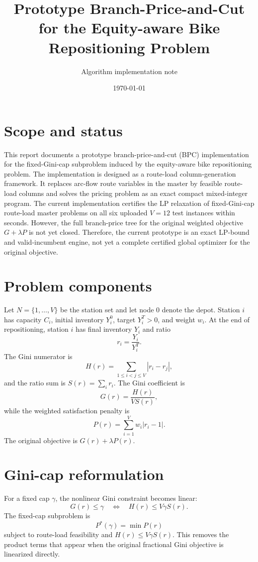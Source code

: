 \documentclass[11pt]{article}
\title{Prototype Branch-Price-and-Cut for the Equity-aware Bike Repositioning Problem}
\author{Algorithm implementation note}
\date{\today}
\begin{document}
\maketitle

\section{Scope and status}
This report documents a prototype branch-price-and-cut (BPC) implementation for the fixed-Gini-cap subproblem induced by the equity-aware bike repositioning problem.  The implementation is designed as a route-load column-generation framework.  It replaces arc-flow route variables in the master by feasible route-load columns and solves the pricing problem as an exact compact mixed-integer program.  The current implementation certifies the LP relaxation of fixed-Gini-cap route-load master problems on all six uploaded $V=12$ test instances within seconds.  However, the full branch-price tree for the original weighted objective $G+\lambda P$ is not yet closed.  Therefore, the current prototype is an exact LP-bound and valid-incumbent engine, not yet a complete certified global optimizer for the original objective.

\section{Problem components}
Let $N=\{1,\ldots,V\}$ be the station set and let node $0$ denote the depot.  Station $i$ has capacity $C_i$, initial inventory $Y_i^0$, target $Y_i^T>0$, and weight $w_i$.  At the end of repositioning, station $i$ has final inventory $Y_i$ and ratio
\[
 r_i=\frac{Y_i}{Y_i^T}.
\]
The Gini numerator is
\[
 H(r)=\sum_{1\le i<j\le V}|r_i-r_j|,
\]
and the ratio sum is $S(r)=\sum_i r_i$.  The Gini coefficient is
\[
 G(r)=\frac{H(r)}{V S(r)},
\]
while the weighted satisfaction penalty is
\[
 P(r)=\sum_{i=1}^V w_i |r_i-1|.
\]
The original objective is $G(r)+\lambda P(r)$.

\section{Gini-cap reformulation}
For a fixed cap $\gamma$, the nonlinear Gini constraint becomes linear:
\[
 G(r)\le \gamma
 \quad\Longleftrightarrow\quad
 H(r)\le V\gamma S(r).
\]
The fixed-cap subproblem is
\[
 P^*(\gamma)=\min P(r)
\]
subject to route-load feasibility and $H(r)\le V\gamma S(r)$.  This removes the product terms that appear when the original fractional Gini objective is linearized directly.
\end{document}
